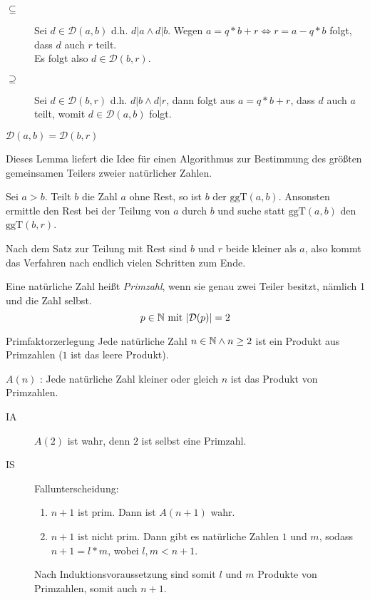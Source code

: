 \begin{description}
  \item[\glqq$\subseteq$\grqq]
  Sei $d\in\mathcal{D}(a,b)$ d.h. $d|a \wedge d|b$. Wegen $a=q*b+r \Leftrightarrow r=a-q*b$ folgt, dass $d$ auch $r$ teilt.\\
  Es folgt also $d\in \mathcal{D}(b,r)$.
  \item[\glqq$\supseteq$\grqq]
  Sei $d\in\mathcal{D}(b,r)$ d.h. $d|b\wedge d|r$, dann folgt aus $a=q*b+r$, dass $d$ auch $a$ teilt, womit $d\in \mathcal{D}(a,b)$ folgt.
\end{description}
$\mathcal{D}(a,b)=\mathcal{D}(b,r)$

\par\medskip
Dieses Lemma liefert die Idee für einen Algorithmus zur Bestimmung des größten gemeinsamen Teilers zweier natürlicher Zahlen.

Sei $a>b$. Teilt $b$ die Zahl $a$ ohne Rest, so ist $b$ der $\mathrm{ggT}(a,b)$. Ansonsten ermittle den Rest bei der Teilung von $a$ durch $b$ und suche statt $\mathrm{ggT}(a,b)$ den $\mathrm{ggT}(b,r)$.

Nach dem Satz zur Teilung mit Rest sind $b$ und $r$ beide kleiner als $a$, also kommt das Verfahren nach endlich vielen Schritten zum Ende.

Eine natürliche Zahl heißt \emph{Primzahl}, wenn sie genau zwei Teiler besitzt, nämlich 1 und die Zahl selbst.
\begin{equation*}
  p\in\mathbb{N} \text{ mit } |\mathcal{D}(p)| = 2
\end{equation*}

\begin{satz}{Primfaktorzerlegung}
  Jede natürliche Zahl $n\in\mathbb{N} \wedge n\geq2$ ist ein Produkt aus Primzahlen ($1$ ist das leere Produkt).
\end{satz}

\beweis
$A(n)$ : \glqq Jede natürliche Zahl kleiner oder gleich $n$ ist das Produkt von Primzahlen.\grqq

\begin{description}
  \item[IA] $A(2)$ ist wahr, denn $2$ ist selbst eine Primzahl.
  \item[IS] Fallunterscheidung:
  \begin{enumerate}
    \item $n+1$ ist prim. Dann ist $A(n+1)$ wahr.
    \item $n+1$ ist nicht prim. Dann gibt es natürliche Zahlen $1$ und $m$, sodass $n+1=l* m$, wobei $l,m<n+1$.
  \end{enumerate}
  Nach Induktionsvoraussetzung sind somit $l$ und $m$ Produkte von Primzahlen, somit auch $n+1$.
\end{description}
